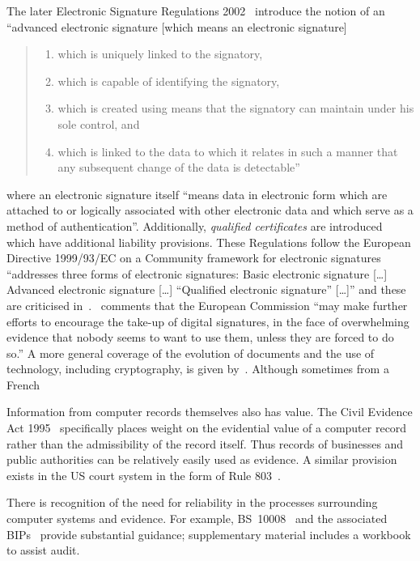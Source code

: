 \documentclass{article}
\def\citeN{\citet}
\def\cite{\citep}
\begin{document}
The later Electronic Signature Regulations 2002~\cite{ESR2002}
introduce the notion of an ``advanced electronic signature [which
means an electronic signature]
\begin{quote}
  \begin{enumerate}\def\labelenumi{{\rm (}\alph{enumi}\/{\rm )}} 
  \item which is uniquely linked to the signatory, \item which is
    capable of identifying the signatory, \item which is created using
    means that the signatory can maintain under his sole control, and
    \item which is linked to the data to which it relates in such a
    manner that any subsequent change of the data is detectable''
  \end{enumerate}
\end{quote}
where an electronic signature itself ``means data in electronic form
which are attached to or logically associated with other electronic
data and which serve as a method of authentication''.  Additionally, \emph{qualified
certificates} are introduced which have additional liability provisions.
These Regulations follow
the European Directive 1999/93/EC on a Community framework for
electronic signatures~\cite{mEUESa,mEUESb}
 ``addresses three forms of electronic
signatures: Basic electronic signature [\ldots] Advanced electronic
signature [\ldots] ``Qualified electronic signature'' [\ldots]'' and
these are criticised in~\citeN{Krawczyk10}.  
\citeN{Mason12}~comments that the European Commission ``may make further efforts to encourage the take-up of digital signatures, in the face of overwhelming evidence that nobody seems to want to use them, unless they are forced to do so.''
A more general coverage of the evolution of documents and the use of technology, including cryptography, is given by~\citeN{Blanchette12}.  Although sometimes from a French

Information from computer records themselves also has value.  The
Civil Evidence Act 1995~\cite{CEA1995} specifically places weight on
the evidential value of a computer record rather than the
admissibility of the record itself.  Thus records of businesses and
public authorities can be relatively easily used as evidence.
A similar provision exists in the US court system in the form of  Rule 803~\cite{mUSevidence}.

There is recognition of the need for reliability in the processes surrounding computer systems and evidence.  For example, BS~10008~\cite{BS10008} and the associated BIPs~\cite{Shipman08,Shipman+08,Howes08} provide substantial guidance; supplementary material includes a workbook to assist audit.
\end{document}
